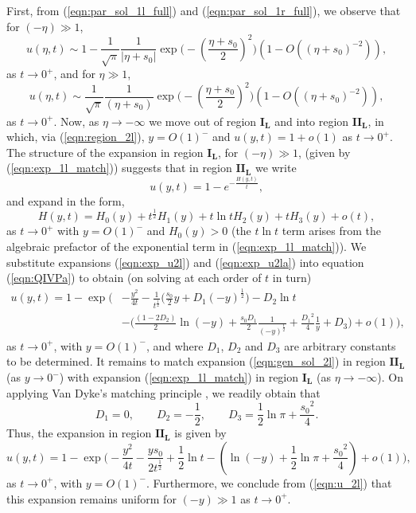 \documentclass[11pt,a4paper]{article}
\newcommand{\eeref}[1]{(\ref{eqn:#1})}
\newcommand{\eelab}[1]{\label{eqn:#1}}
\def\beq{\begin{equation}}
\def\eeq{\end{equation}}
\begin{document}
First, from \eeref{par_sol_1l_full} and \eeref{par_sol_1r_full}, we observe that for $(- \eta) \gg 1$, 
\beq \eelab{exp_1l_match}
u(\eta,t) \sim 1 - \frac{1}{\sqrt{\pi}} \frac{1}{ \lvert \eta + s_0 \rvert } \exp \bigg( - \left( \frac{\eta + s_0}{2} \right)^2 \bigg)  ( 1 - O((\eta +s_0)^{-2}) ) ,
\eeq
as $t \to 0^+$, and for $\eta \gg 1$, 
\beq \eelab{exp_1r_match}
u(\eta,t) \sim \frac{1}{\sqrt{\pi}} \frac{1}{ \left( \eta + s_0  \right) } \exp \bigg( - \left( \frac{\eta + s_0}{2} \right)^2 \bigg) ( 1 - O((\eta +s_0)^{-2}) ),
\eeq
as $t \to 0^+$.
%
Now, as $ \eta \to - \infty$ we move out of region $\mathbf{I_L}$ and into region $\mathbf{II_L}$, in which, via \eeref{region_2l},  $y=O(1)^-$ and $u(y,t)=1 + o(1)$ as $t \to 0^+$. The structure of the expansion in region $\mathbf{I_L}$, for $(- \eta) \gg 1$, (given by \eeref{exp_1l_match}) suggests that in region $\mathbf{II_L}$ we write 
\beq \eelab{exp_u2l}
u(y,t) = 1 - e^{-\frac{H(y,t)}{t}},
\eeq
and expand in the form, 
\beq \eelab{exp_u2la}
H(y,t) = H_0(y) + t^{\frac{1}{2}} H_1(y) + t \ln t H_2(y) + t H_3(y) + o(t),
\eeq
as $t \to 0^+$ with $y=O(1)^-$ and $H_0(y) > 0$ (the $t\ln t$ term arises from the algebraic prefactor of the exponential term in \eeref{exp_1l_match}). We substitute expansions \eeref{exp_u2l} and \eeref{exp_u2la} into equation \eeref{QIVPa} to obtain (on solving at each order of $t$ in turn)
\beq\eelab{gen_sol_2l}
\begin{split}
	 u(y,t) = 1  - \exp \Bigg( & -  \frac{y^2 }{4t}   - \frac{1}{t^{\frac{1}{2}}} \bigg( \frac{s_0}{2} y + D_1 (-y)^{\frac{1}{2}} \bigg)   - D_2 \ln t   \\
	 &  - \bigg( \frac{ \left( 1-2D_2 \right) }{2} \ln  (-y)  + \frac{s_0 D_1}{2} 
	 \frac{1}{ \left(-y \right)^{\frac{1}{2}}} + \frac{{D_1}^2}{4} \frac{1}{ y } + D_3 \bigg) +o(1) \Bigg),
%
\end{split}
\eeq
as $t \to 0^+$, with $y=O(1)^-$, and where $D_1$, $D_2$ and $D_3$ are arbitrary constants to be determined. It remains to match expansion \eeref{gen_sol_2l} in region $\mathbf{II_L}$ (as $y \to 0^-$) with expansion \eeref{exp_1l_match} in region $\mathbf{I_L}$ (as $\eta \to -\infty$). On applying Van Dyke's matching principle \cite{VanDyke1975}, we readily obtain that 
\beq
  D_1=0, \qquad D_2 = - \frac{1}{2}, \qquad D_3 =\frac{1}{2} \ln \pi + \frac{{s_0}^2}{4}.
\eeq 
Thus, the expansion in region $\mathbf{II_L}$ is given by 
 \beq \eelab{u_2l}
u(y,t) =  1  - \exp \Bigg( -\frac{y^2}{4t}  - \frac{y s_0}{2 t^{\frac{1}{2}}}   + \frac{1}{2} \ln t - \left( \ln ( - y ) + \frac{1}{2} \ln \pi  + \frac{{s_0}^2}{4} \right) +o(1) \Bigg),  
\eeq
as $t \to 0^+$,  with $y=O(1)^-$. Furthermore, we conclude from \eeref{u_2l} that this expansion remains uniform for $(-y) \gg 1$ as $t \to 0^+$.
\end{document}
